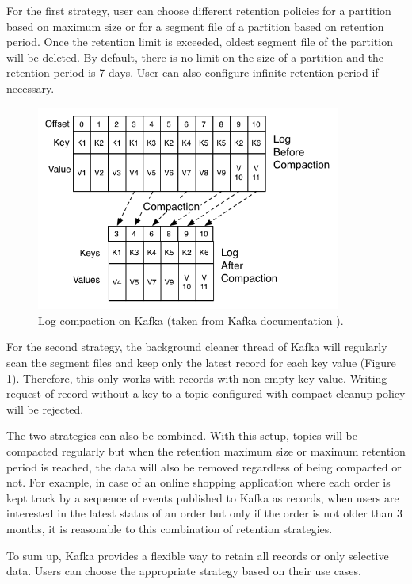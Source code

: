 For the first strategy, user can choose different retention policies for a partition based on maximum size or for a segment file of a partition based on retention period. Once the retention limit is exceeded, oldest segment file of the partition will be deleted. By default, there is no limit on the size of a partition and the retention period is 7 days. User can also configure infinite retention period if necessary.

\begin{figure}[h]
	\centering
	\includegraphics[width=10cm]{images/compact-kafka.png}
	\caption{Log compaction on Kafka (taken from Kafka documentation \cite{kafkadesignlogcompact}).}
	\label{fig:compactekafka}
\end{figure}
For the second strategy, the background cleaner thread of Kafka will regularly scan the segment files and keep only the latest record for each key value (Figure \ref{fig:compactekafka}). Therefore, this only works with records with non-empty key value. Writing request of record without a key to a topic configured with compact cleanup policy will be rejected.


The two strategies can also be combined. With this setup, topics will be compacted regularly but when the retention maximum size or maximum retention period is reached, the data will also be removed regardless of being compacted or not. For example, in case of an online shopping application where each order is kept track by a sequence of events published to Kafka as records, when users are interested in the latest status of an order but only if the order is not older than 3 months, it is reasonable to this combination of retention strategies.

To sum up, Kafka provides a flexible way to retain all records or only selective data. Users can choose the appropriate strategy based on their use cases. 


